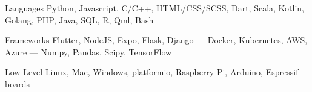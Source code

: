 
\begin{cvskills}
  \cvskill
    {Languages} %
    {Python, Javascript, C/C++, HTML/CSS/SCSS, Dart, Scala, Kotlin, Golang, PHP, Java, SQL, R, Qml, Bash} %

  \cvskill
    {Frameworks} %
    {Flutter, NodeJS, Expo, Flask, Django --- Docker, Kubernetes, AWS, Azure --- Numpy, Pandas, Scipy, TensorFlow} %

  \cvskill
    {Low-Level} %
    {Linux, Mac, Windows, platformio, Raspberry Pi, Arduino, Espressif boards} %

\end{cvskills}
